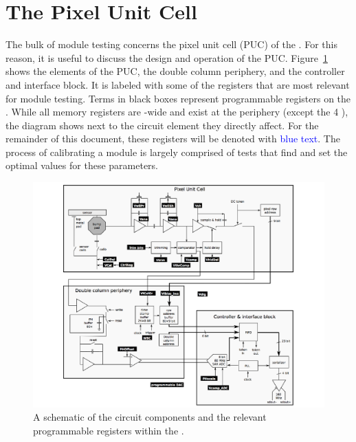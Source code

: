 \section{The Pixel Unit Cell}
\label{s:puc}

The bulk of module testing concerns the pixel unit cell (PUC) of the \roc.  
For this reason, it is useful to discuss the design and operation of the PUC.  
Figure~\ref{fig:puc} shows the elements of the PUC, the double column periphery, and the controller and interface block.  
It is labeled with some of the \dac registers that are most relevant for module testing.  
Terms in black boxes represent programmable \dac registers on the \roc.
While all \dac memory registers are \roc-wide and exist at the periphery (except the 4 \trimbits), 
the diagram shows \dacs next to the circuit element they directly affect.
For the remainder of this document, these \dac registers will be denoted with \textcolor{blue}{blue text}.  
The process of calibrating a module is largely comprised of tests that find and set the optimal values for these parameters.  

\begin{figure}[hbtp]
\begin{center}
\includegraphics[width=\textwidth]{figures/ROC_dac_schematic.pdf}
\caption{A schematic of the circuit components and the relevant programmable registers within the \roc.}
\label{fig:puc}
\end{center}
\end{figure}

